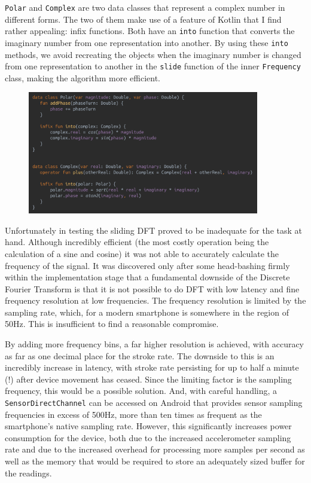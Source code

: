 \documentclass[11pt,twoside,a4paper]{report}
\begin{document}
\texttt{Polar} and \texttt{Complex} are two data classes that represent a complex number in different forms. The two of them make use of a feature of Kotlin that I find rather appealing: infix functions. Both have an \texttt{into} function that converts the imaginary number from one representation into another. By using these \texttt{into} methods, we avoid recreating the objects when the imaginary number is changed from one representation to another in the \texttt{slide} function of the inner \texttt{Frequency} class, making the algorithm more efficient.

\begin{figure}[h!]
  \centering
  \includegraphics[width=0.9\textwidth]{code-SDFT-complex-polar.png}
  \caption{}
  \label{fig:complexPolar}
\end{figure}

\label{DFT_downsides}
Unfortunately in testing the sliding DFT proved to be inadequate for the task at hand. Although incredibly efficient (the most costly operation being the calculation of a sine and cosine) it was not able to accurately calculate the frequency of the signal. It was discovered only after some head-bashing firmly within the implementation stage that a fundamental downside of the Discrete Fourier Transform is that it is not possible to do DFT with low latency and fine frequency resolution at low frequencies.\cite{dsp_stack_dft} The frequency resolution is limited by the sampling rate, which, for a modern smartphone is somewhere in the region of 50Hz. This is insufficient to find a reasonable compromise.

By adding more frequency bins, a far higher resolution is achieved, with accuracy as far as one decimal place for the stroke rate. The downside to this is an incredibly increase in latency, with stroke rate persisting for up to half a minute (!) after device movement has ceased. Since the limiting factor is the sampling frequency, this would be a possible solution. And, with careful handling, a \texttt{SensorDirectChannel} can be accessed on Android that provides sensor sampling frequencies in excess of 500Hz, more than ten times as frequent as the smartphone's native sampling rate. However, this significantly increases power consumption for the device, both due to the increased accelerometer sampling rate and due to the increased overhead for processing more samples per second as well as the memory that would be required to store an adequately sized buffer for the readings.
\end{document}
